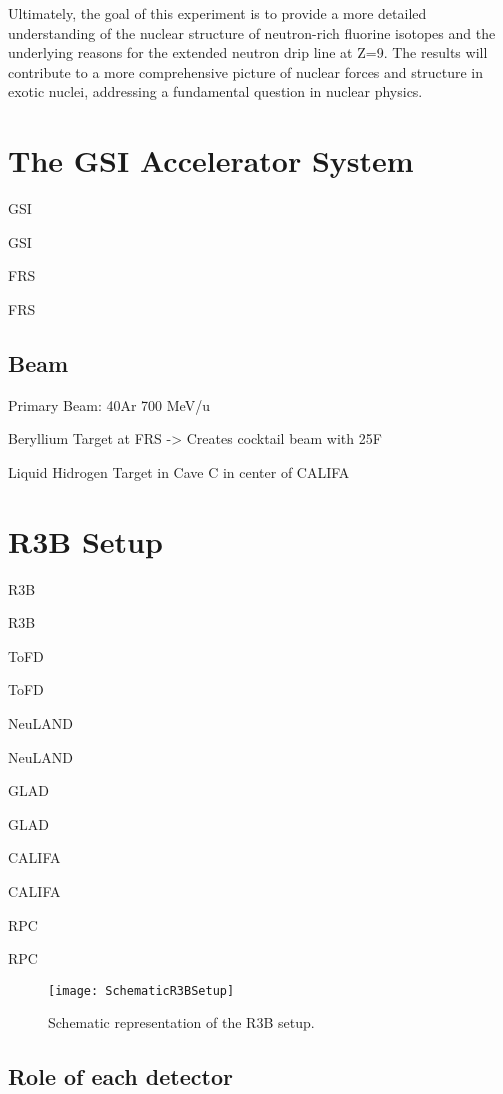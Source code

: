 Ultimately, the goal of this experiment is to provide a more detailed understanding of the nuclear structure of neutron-rich fluorine isotopes and the underlying reasons for the extended neutron drip line at Z=9. The results will contribute to a more comprehensive picture of nuclear forces and structure in exotic nuclei, addressing a fundamental question in nuclear physics.


\section{The GSI Accelerator System}

\gls{GSI}

\gls{GSI}

\gls{FRS}

\gls{FRS}

\subsection{Beam}

Primary Beam: 40Ar 700 MeV/u

Beryllium Target at FRS -> Creates cocktail beam with 25F

Liquid Hidrogen Target in Cave C in center of CALIFA

\section{R3B Setup}

\gls{R3B}

\gls{R3B}

\gls{ToFD}

\gls{ToFD}

\gls{NeuLAND}

\gls{NeuLAND}

\gls{GLAD}

\gls{GLAD}

\gls{CALIFA}

\gls{CALIFA}

\gls{RPC}

\gls{RPC}
\begin{figure}
	\texttt{[image: SchematicR3BSetup]}
	\caption{Schematic representation of the R3B setup.}
	\label{fig:R3BSetup}
\end{figure}



\subsection{Role of each detector}

